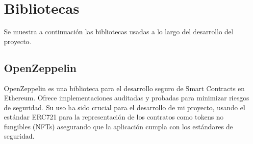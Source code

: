 \section{Bibliotecas}

Se muestra a continuación las bibliotecas usadas a lo largo del desarrollo del proyecto.

\subsection{OpenZeppelin}

OpenZeppelin es una biblioteca para el desarrollo seguro de Smart Contracts en Ethereum. Ofrece implementaciones auditadas y probadas para minimizar riesgos de seguridad.
Su uso ha sido crucial para el desarrollo de mi proyecto, usando el estándar ERC721 para la representación de los contratos como tokens no fungibles (NFTs) asegurando que la aplicación cumpla con los estándares de seguridad.

